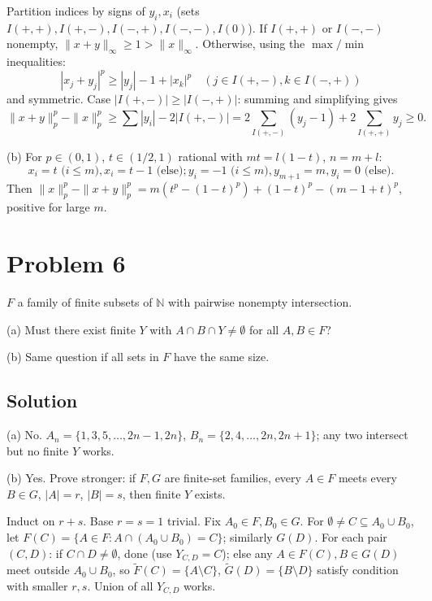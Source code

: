 \documentclass{article}
\begin{document}
Partition indices by signs of $y_i, x_i$ (sets $I(+,+), I(+,-), I(-,+), I(-,-), I(0)$). If $I(+,+)$ or $I(-,-)$ nonempty, $\|x+y\|_\infty\ge 1>\|x\|_\infty$. Otherwise, using the $\max/\min$ inequalities:
\[|x_j+y_j|^p \ge |y_j|-1+|x_k|^p\quad (j\in I(+,-), k\in I(-,+))\]
and symmetric. Case $|I(+,-)|\ge |I(-,+)|$: summing and simplifying gives
\[\|x+y\|_p^p - \|x\|_p^p \ge \sum|y_i| - 2|I(+,-)| = 2\sum_{I(+,-)}(y_j-1) + 2\sum_{I(+,+)}y_j \ge 0.\]

(b) For $p\in(0,1)$, $t\in(1/2,1)$ rational with $mt=l(1-t)$, $n=m+l$:
\[x_i=t\text{ (}i\le m\text{)}, x_i=t-1\text{ (else)}; y_i=-1\text{ (}i\le m\text{)}, y_{m+1}=m, y_i=0\text{ (else)}.\]
Then $\|x\|_p^p-\|x+y\|_p^p = m(t^p-(1-t)^p) + (1-t)^p - (m-1+t)^p$, positive for large $m$.

\section*{Problem 6}
$F$ a family of finite subsets of $\mathbb{N}$ with pairwise nonempty intersection.

(a) Must there exist finite $Y$ with $A\cap B\cap Y\ne\emptyset$ for all $A,B\in F$?

(b) Same question if all sets in $F$ have the same size.

\subsection*{Solution}
(a) No. $A_n=\{1,3,5,\dots,2n-1,2n\}$, $B_n=\{2,4,\dots,2n, 2n+1\}$; any two intersect but no finite $Y$ works.

(b) Yes. Prove stronger: if $F,G$ are finite-set families, every $A\in F$ meets every $B\in G$, $|A|=r$, $|B|=s$, then finite $Y$ exists.

Induct on $r+s$. Base $r=s=1$ trivial. Fix $A_0\in F, B_0\in G$. For $\emptyset\ne C\subseteq A_0\cup B_0$, let $F(C)=\{A\in F : A\cap(A_0\cup B_0)=C\}$; similarly $G(D)$. For each pair $(C,D)$: if $C\cap D\ne\emptyset$, done (use $Y_{C,D}=C$); else any $A\in F(C), B\in G(D)$ meet outside $A_0\cup B_0$, so $\tilde F(C)=\{A\setminus C\}$, $\tilde G(D)=\{B\setminus D\}$ satisfy condition with smaller $r,s$. Union of all $Y_{C,D}$ works.
\end{document}
